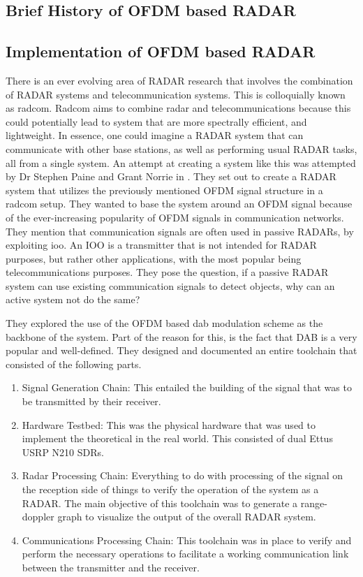 \documentclass[class=report,11pt,crop=false]{standalone}
\begin{document}
\subsection{Brief History of OFDM based RADAR}
\subsection{Implementation of OFDM based RADAR}
There is an ever evolving area of RADAR research that involves the combination of RADAR systems and telecommunication systems. This is colloquially known as \gls{radcom}. Radcom aims to combine radar and telecommunications because this could potentially lead to system that are more spectrally efficient, and lightweight. In essence, one could imagine a RADAR system that can communicate with other base stations, as well as performing usual RADAR tasks, all from a single system. An attempt at creating a system like this was attempted by Dr Stephen Paine and Grant Norrie in \cite{Design_and_Demonstration_of_an_OFDM_Based_RadCom_System}. They set out to create a RADAR system that utilizes the previously mentioned OFDM signal structure in a radcom setup. They wanted to base the system around an OFDM signal because of the ever-increasing popularity of OFDM signals in communication networks. They mention that communication signals are often used in passive RADARs, by exploiting \gls{ioo}. An IOO is a transmitter that is not intended for RADAR purposes, but rather other applications, with the most popular being telecommunications purposes. They pose the question, if a passive RADAR system can use existing communication signals to detect objects, why can an active system not do the same?

They explored the use of the OFDM based \gls{dab} modulation scheme as the backbone of the system. Part of the reason for this, is the fact that DAB is a very popular and well-defined. They designed and documented an entire toolchain that consisted of the following parts.

\begin{enumerate}
    \item Signal Generation Chain: This entailed the building of the signal that was to be transmitted by their receiver.
    \item Hardware Testbed: This was the physical hardware that was used to implement the theoretical in the real world. This consisted of dual Ettus USRP N210 SDRs.
    \item Radar Processing Chain: Everything to do with processing of the signal on the reception side of things to verify the operation of the system as a RADAR. The main objective of this toolchain was to generate a range-doppler graph to visualize the output of the overall RADAR system.
    \item Communications Processing Chain: This toolchain was in place to verify and perform the necessary operations to facilitate a working communication link between the transmitter and the receiver.
\end{enumerate}
\end{document}

